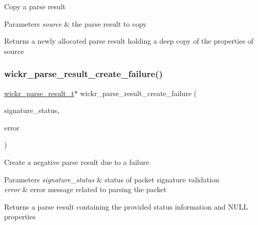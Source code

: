 Copy a parse result


\begin{DoxyParams}{Parameters}
{\em source} & the parse result to copy \\
\hline
\end{DoxyParams}
\begin{DoxyReturn}{Returns}
a newly allocated parse result holding a deep copy of the properties of \textquotesingle{}source\textquotesingle{} 
\end{DoxyReturn}
\mbox{\label{group__wickr__protocol_gac2673bcfeae2f8d693e523809bb6bb30}} 
\subsubsection{\texorpdfstring{wickr\_parse\_result\_create\_failure()}{wickr\_parse\_result\_create\_failure()}}
{\footnotesize\ttfamily \mbox{\hyperlink{structwickr__parse__result}{wickr\+\_\+parse\+\_\+result\+\_\+t}}$\ast$ wickr\+\_\+parse\+\_\+result\+\_\+create\+\_\+failure (\begin{DoxyParamCaption}\item[{wickr\+\_\+packet\+\_\+signature\+\_\+status}]{signature\+\_\+status,  }\item[{wickr\+\_\+decode\+\_\+error}]{error }\end{DoxyParamCaption})}

Create a negative parse result due to a failure


\begin{DoxyParams}{Parameters}
{\em signature\+\_\+status} & status of packet signature validation \\
\hline
{\em error} & error message related to parsing the packet \\
\hline
\end{DoxyParams}
\begin{DoxyReturn}{Returns}
a parse result containing the provided status information and N\+U\+LL properties 
\end{DoxyReturn}
\mbox{\label{group__wickr__protocol_ga7bd98225a92620e1aa5940cf59fdbedf}} 
